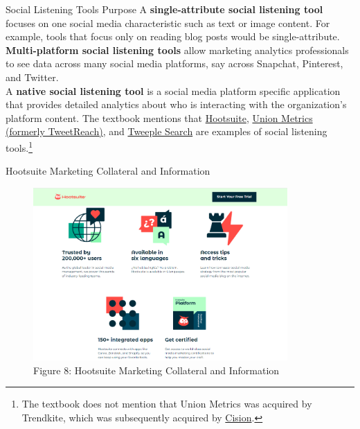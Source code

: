 \documentclass[pdf]{beamer}
\newcommand{\empr}[1]{{\color{franklinblue}\textbf{#1}}}
\theoremstyle{remark}
\theoremstyle{definition}
\begin{document}
\begin{frame}[t]{Social Listening Tools Purpose}
A \empr{single-attribute social listening tool} focuses on one social media characteristic such as text or image content. For example, tools that focus only on reading blog posts would be single-attribute. \\
\vspace{1.5ex}
\empr{Multi-platform social listening tools} allow marketing analytics professionals to see data across many social media platforms, say across Snapchat, Pinterest, and Twitter. \\
\vspace{1.5ex}
A \empr{native social listening tool} is a social media platform specific application that provides detailed analytics about who is interacting with the organization's platform content. The textbook mentions that \href{https://www.hootsuite.com/}{Hootsuite}, \href{https://partners.twitter.com/en/partners/union-metrics}{Union Metrics (formerly TweetReach)}, and \href{https://tweeplesearch.com/?nav=pricing}{Tweeple Search} are examples of social listening tools.\footnote{The textbook does not mention that Union Metrics was acquired by Trendkite, which was subsequently acquired by \href{https://www.cision.com/}{Cision}.}
\end{frame}

\begin{frame}[t]{Hootsuite Marketing Collateral and Information}
\begin{figure}[htbp]
  \captionsetup{justification=centering}
  \includegraphics[height=6.6cm, trim=0.0cm 0.0cm 0.0cm 0.0cm width=6.6cm]{Images/Hootsuite_SocialMedia_1022_4.png}
  \caption{Figure {\color{franklinblue} 8}: Hootsuite Marketing Collateral and Information}
\end{figure}
\end{frame}
\end{document}
